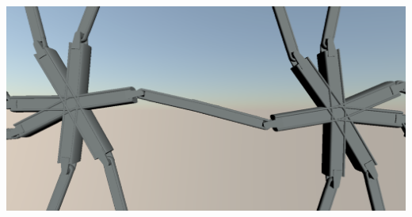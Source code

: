 \documentclass{article}
\begin{document}
\includegraphics[scale=0.1]{example1.png}

\pagebreak

\printbibliography

\nocite{*}
\end{document}
